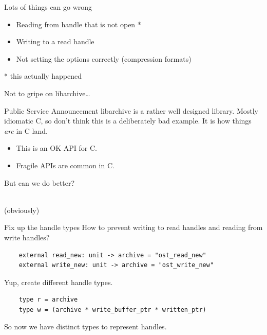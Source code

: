 \documentclass{beamer}
\renewcommand{\example}[1]{{\usebeamercolor[fg]{example text} #1}}
\begin{document}
\begin{frame}
  Lots of things can go wrong
  \begin{itemize}
    \item Reading from handle that is not open *
    \item Writing to a read handle
    \item Not setting the options correctly (compression formats)
  \end{itemize}
  \pause
  * this actually happened
\end{frame}

\begin{frame}
  Not to gripe on libarchive…

  \begin{exampleblock}{Public Service Announcement}
    libarchive is a rather well designed library. Mostly idiomatic C, so don't
    think this is a deliberately bad example. It is how things \emph{are} in C
    land.
  \end{exampleblock}

  \begin{itemize}
    \item This is an OK API for C.
    \item Fragile APIs are common in C.
  \end{itemize}

  \vspace{2ex}
  \pause
  \begin{center}
    {\Large But can we do better?}
  \end{center}
\end{frame}

\begin{frame}
  \begin{center}
    {\fontsize{63pt}{1em}\selectfont \example{\textbf{Yes}}}\\
    \pause
    {\scriptsize (obviously)}
  \end{center}
\end{frame}

\begin{frame}[fragile]{Fix up the handle types}
  How to prevent writing to read handles and reading from write handles?
  \begin{verbatim}
    external read_new: unit -> archive = "ost_read_new"
    external write_new: unit -> archive = "ost_write_new"
  \end{verbatim}
  \pause
  Yup, create different handle types.
  \begin{verbatim}
    type r = archive
    type w = (archive * write_buffer_ptr * written_ptr)
  \end{verbatim}
  So now we have distinct types to represent handles.
\end{frame}
\end{document}
